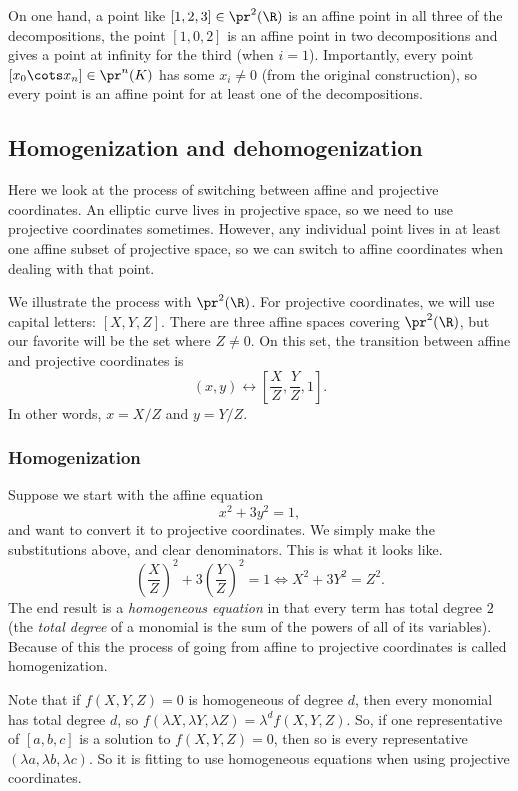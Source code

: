 \documentclass[12pt]{amsart}
\theoremstyle{plain}
\theoremstyle{definition}
\theoremstyle{remark}
\begin{document}
On one hand, a point like $[1,2,3]\in\pr^2(\R)$ is an affine point in all
three of the decompositions, the point $[1,0,2]$ is an affine point in two
decompositions and gives a point at infinity for the third (when $i=1$).
Importantly, every point $[x_0\cots x_n]\in\pr^n(K)$ has some $x_i\neq 0$
(from the original construction), so every point is an affine point for
at least one of the decompositions.

\subsection{Homogenization and dehomogenization}
Here we look at the process of switching between affine and projective
coordinates.  An elliptic curve lives in projective space, so we need
to use projective coordinates sometimes. However, any individual point
lives in at least one affine subset of projective space, so we can
switch to affine coordinates when dealing with that point.

We illustrate the process with $\pr^2(\R)$.  For projective
coordinates, we will use capital letters: $[X,Y,Z]$.  There are three
affine spaces covering $\pr^2(\R)$, but our favorite will be the set
where $Z\neq 0$.  On this set, the transition between affine and
projective coordinates is
\[ (x,y) \leftrightarrow \left[\frac X Z, \frac Y Z, 1\right].\]
In other words, $x=X/Z$ and $y=Y/Z$.

\subsubsection{Homogenization}

Suppose we start with the affine equation 
\begin{equation}\label{ex1}
x^2+3y^2 = 1,
\end{equation}
and want to convert it to projective coordinates.  We simply make the
substitutions above, and clear denominators.  This is what it looks
like.
\begin{equation} \label{eq1hom}
 \left(\frac X Z\right)^2 + 3\left( \frac Y Z\right)^2 = 1 \iff
X^2+3Y^2=Z^2.
\end{equation}
The end result is a \emph{homogeneous equation} in that every term has
total degree $2$ (the \emph{total degree} of a monomial is the sum of
the powers of all of its variables).  Because of this the process of
going from affine to projective coordinates is called homogenization.

Note that if $f(X,Y,Z)=0$ is homogeneous of degree $d$, then every
monomial has total degree $d$, so $f(\lambda X, \lambda Y, \lambda Z)=
\lambda^d f(X,Y,Z)$.  So, if one representative of $[a,b,c]$ is a
solution to $f(X,Y,Z)=0$, then so is every representative $(\lambda a,
\lambda b, \lambda c)$.  So it is fitting to use homogeneous equations
when using projective coordinates.
\end{document}
